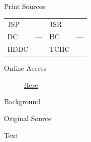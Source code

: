 			\begin{description}
					\item[Print Sources]
				\end{description}

					\begin{tabular}{p{0.5in}p{1in}p{0.5in}p{1in}}
					JSP	 	& 			& JSR 		&  \\
					DC	 	& ---		& HC 		& --- \\
					HDDC 	& ---		& TCHC 		& --- \\
					\end{tabular}
				
				\begin{description}
					\item[Online Access] \href{https://www.josephsmithpapers.org/paper-summary/letter-to-edward-partridge-and-the-church-circa-22-march-1839/1}{Here}
				\end{description}
				
				\begin{description}
					\item[Background]
				\end{description}
				
				
				\begin{description}
					\item[Original Source]
				\end{description}
				
				
				\begin{description}
					\item[Text]
				\end{description}
				
